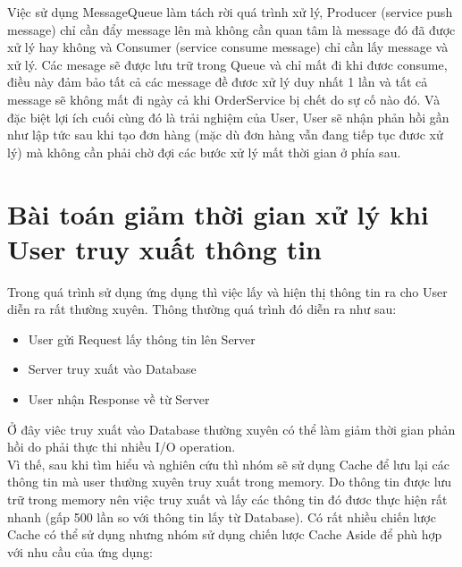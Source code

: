         Việc sử dụng MessageQueue làm tách rời quá trình xử lý, Producer (service push message) chỉ cần đẩy message lên mà không cần quan tâm là message đó đã được xử lý hay không và Consumer (service consume message) chỉ cần lấy message và xử lý. Các mesage sẽ được lưu trữ trong Queue và chỉ mất đi khi đươc consume, điều này đảm bảo tất cả các message đề đươc xử lý duy nhất 1 lần và tất cả message sẽ không mất đi ngày cả khi OrderService bị chết do sự cố nào đó. Và đặc biệt lợi ích cuối cùng đó là trải nghiệm của User, User sẽ nhận phản hồi gần như lập tức sau khi tạo đơn hàng (mặc dù đơn hàng vẫn đang tiếp tục đươc xử lý) mà không cần phải chờ đợi các bước xử lý mất thời gian ở phía sau. 
	
		\section{Bài toán giảm thời gian xử lý khi User truy xuất thông tin}
		    Trong quá trình sử dụng ứng dụng thì việc lấy và hiện thị thông tin ra cho User diễn ra rất thường xuyên. Thông thường quá trình đó diễn ra như sau:
		    \begin{itemize}
                \item User gửi Request lấy thông tin lên Server
                \item Server truy xuất vào Database
                \item User nhận Response về từ Server 
            \end{itemize}
            
            
            Ở đây viêc truy xuất vào Database thường xuyên có thể làm giảm thời gian phản hồi do phải thực thi nhiều I/O operation. \\
            
            Vì thế, sau khi tìm hiểu và nghiên cứu thì nhóm sẽ sử dụng Cache để lưu lại các thông tin mà user thường xuyên truy xuất trong memory. Do thông tin được lưu trữ trong memory nên việc truy xuất và lấy các thông tin đó đươc thực hiện rất nhanh (gấp 500 lần so với thông tin lấy từ Database). Có rất nhiều chiến lược Cache có thể sử dụng nhưng nhóm sử dụng chiến lược Cache Aside để phù hợp với nhu cầu của ứng dụng:
            
